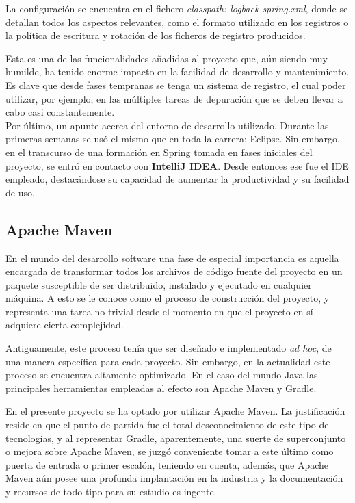 \documentclass[a4paper,12pt,twoside,openright]{report}
\begin{document}
    La configuración se encuentra en el fichero \emph{classpath: logback-spring.xml}, donde se detallan todos los aspectos relevantes, como el formato utilizado en los registros o la política de escritura y rotación de los ficheros de registro producidos.
    
    Esta es una de las funcionalidades añadidas al proyecto que, aún siendo muy humilde, ha tenido enorme impacto en la facilidad de desarrollo y mantenimiento. Es clave que desde fases tempranas se tenga un sistema de registro, el cual poder utilizar, por ejemplo, en las múltiples tareas de depuración que se deben llevar a cabo casi constantemente.
    \\
    
    Por último, un apunte acerca del entorno de desarrollo utilizado. Durante las primeras semanas se usó el mismo que en toda la carrera: Eclipse. Sin embargo, en el transcurso de una formación en Spring tomada en fases iniciales del proyecto, se entró en contacto con \textbf{IntelliJ IDEA}. Desde entonces ese fue el IDE empleado, destacándose su capacidad de aumentar la productividad y su facilidad de uso.
    
    \subsection{Apache Maven}
    En el mundo del desarrollo software una fase de especial importancia es aquella encargada de transformar todos los archivos de código fuente del proyecto en un paquete susceptible de ser distribuido, instalado y ejecutado en cualquier máquina. A esto se le conoce como el proceso de construcción del proyecto, y representa una tarea no trivial desde el momento en que el proyecto en sí adquiere cierta complejidad.
    
    Antiguamente, este proceso tenía que ser diseñado e implementado \emph{ad hoc}, de una manera específica para cada proyecto. Sin embargo, en la actualidad este proceso se encuentra altamente optimizado. En el caso del mundo Java las principales herramientas empleadas al efecto son Apache Maven y Gradle.
    
    En el presente proyecto se ha optado por utilizar Apache Maven. La justificación reside en que el punto de partida fue el total desconocimiento de este tipo de tecnologías, y al representar Gradle, aparentemente, una suerte de superconjunto o mejora sobre Apache Maven, se juzgó conveniente tomar a este último como puerta de entrada o primer escalón, teniendo en cuenta, además, que Apache Maven aún posee una profunda implantación en la industria y la documentación y recursos de todo tipo para su estudio es ingente.
    
\end{document}
